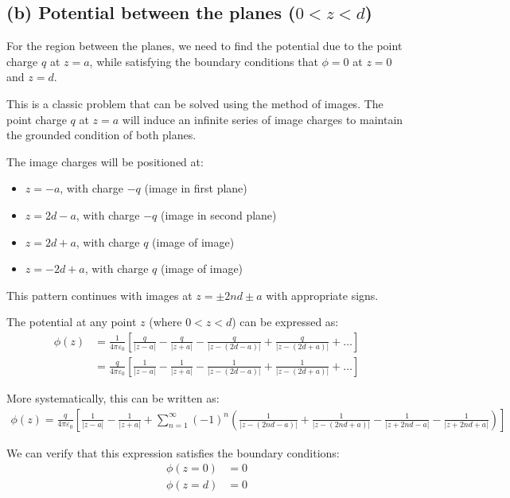 \documentclass{article}
\begin{document}
\subsection*{(b) Potential between the planes ($0 < z < d$)}

For the region between the planes, we need to find the potential due to the point charge $q$ at $z = a$, while satisfying the boundary conditions that $\phi = 0$ at $z = 0$ and $z = d$.

This is a classic problem that can be solved using the method of images. The point charge $q$ at $z = a$ will induce an infinite series of image charges to maintain the grounded condition of both planes.

The image charges will be positioned at:
\begin{itemize}
\item $z = -a$, with charge $-q$ (image in first plane)
\item $z = 2d-a$, with charge $-q$ (image in second plane)
\item $z = 2d+a$, with charge $q$ (image of image)
\item $z = -2d+a$, with charge $q$ (image of image)
\end{itemize}

This pattern continues with images at $z = \pm 2nd \pm a$ with appropriate signs.

The potential at any point $z$ (where $0 < z < d$) can be expressed as:
\begin{align}
\phi(z) &= \frac{1}{4\pi\varepsilon_0}\left[\frac{q}{|z-a|} - \frac{q}{|z+a|} - \frac{q}{|z-(2d-a)|} + \frac{q}{|z-(2d+a)|} + \ldots\right]\\
&= \frac{q}{4\pi\varepsilon_0}\left[\frac{1}{|z-a|} - \frac{1}{|z+a|} - \frac{1}{|z-(2d-a)|} + \frac{1}{|z-(2d+a)|} + \ldots\right]
\end{align}

More systematically, this can be written as:
\begin{align}
\phi(z) = \frac{q}{4\pi\varepsilon_0}\left[\frac{1}{|z-a|} - \frac{1}{|z+a|} + \sum_{n=1}^{\infty}(-1)^n\left(\frac{1}{|z-(2nd-a)|} + \frac{1}{|z-(2nd+a)|} - \frac{1}{|z+2nd-a|} - \frac{1}{|z+2nd+a|}\right)\right]
\end{align}

We can verify that this expression satisfies the boundary conditions:
\begin{align}
\phi(z=0) &= 0\\
\phi(z=d) &= 0
\end{align}
\end{document}

